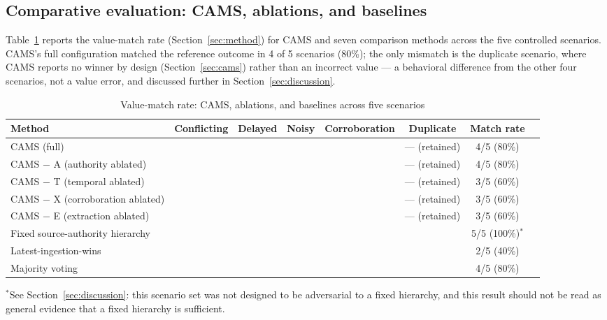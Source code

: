 \documentclass[conference]{IEEEtran}
\newcommand{\okmark}{\textcolor{cgood}{\checkmark}}
\newcommand{\badmark}{\textcolor{ccrit}{\textbf{\ding{55}}}}
\begin{document}
\subsection{Comparative evaluation: CAMS, ablations, and baselines}

Table~\ref{tab:comparison} reports the value-match rate
(Section~\ref{sec:method}) for CAMS and seven comparison methods across the
five controlled scenarios. CAMS's full configuration matched the reference
outcome in 4 of 5 scenarios (80\%); the only mismatch is the duplicate
scenario, where CAMS reports no winner by design (Section~\ref{sec:cams})
rather than an incorrect value --- a behavioral difference from the other
four scenarios, not a value error, and discussed further in
Section~\ref{sec:discussion}.

\begin{table}[t]
\centering
\caption{Value-match rate: CAMS, ablations, and baselines across five scenarios}
\label{tab:comparison}
\begin{tabular}{lccccccc}
\toprule
\rowcolor{headerfill}
\textcolor{headertext}{\textbf{Method}} & \textcolor{headertext}{\textbf{Conflicting}} & \textcolor{headertext}{\textbf{Delayed}} & \textcolor{headertext}{\textbf{Noisy}} & \textcolor{headertext}{\textbf{Corroboration}} & \textcolor{headertext}{\textbf{Duplicate}} & \textcolor{headertext}{\textbf{Match rate}} \\
\midrule
CAMS (full) & \okmark & \okmark & \okmark & \okmark & --- (retained) & 4/5 (80\%) \\
CAMS $-$ A (authority ablated) & \okmark & \okmark & \okmark & \okmark & --- (retained) & 4/5 (80\%) \\
CAMS $-$ T (temporal ablated) & \okmark & \badmark & \okmark & \okmark & --- (retained) & 3/5 (60\%) \\
CAMS $-$ X (corroboration ablated) & \okmark & \okmark & \okmark & \badmark & --- (retained) & 3/5 (60\%) \\
CAMS $-$ E (extraction ablated) & \okmark & \okmark & \badmark & \okmark & --- (retained) & 3/5 (60\%) \\
Fixed source-authority hierarchy & \okmark & \okmark & \okmark & \okmark & \okmark & 5/5 (100\%)$^{*}$ \\
Latest-ingestion-wins & \badmark & \badmark & \badmark & \okmark & \okmark & 2/5 (40\%) \\
Majority voting & \okmark & \okmark & \okmark & \badmark & \okmark & 4/5 (80\%) \\
\bottomrule
\end{tabular}

\vspace{2pt}
\footnotesize $^{*}$See Section~\ref{sec:discussion}: this scenario set was not designed to be adversarial to a fixed hierarchy, and this result should not be read as general evidence that a fixed hierarchy is sufficient.
\end{table}
\end{document}
